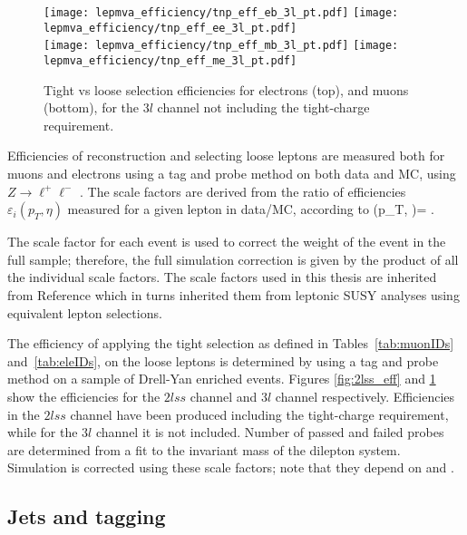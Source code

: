 \begin{figure}[!hb]
\centering
  \texttt{[image: lepmva\_efficiency/tnp\_eff\_eb\_3l\_pt.pdf]}
  \texttt{[image: lepmva\_efficiency/tnp\_eff\_ee\_3l\_pt.pdf]}\\
  \texttt{[image: lepmva\_efficiency/tnp\_eff\_mb\_3l\_pt.pdf]}
  \texttt{[image: lepmva\_efficiency/tnp\_eff\_me\_3l\_pt.pdf]}
\caption[Tight vs loose lepton selection efficiencies in the $3l$ channel.]{Tight vs loose selection efficiencies for electrons (top), and muons (bottom), for the $3l$ channel not including the tight-charge requirement.}
\label{fig:3l_eff}
\end{figure}

Efficiencies of reconstruction and selecting loose leptons are measured both for muons and electrons using a tag and probe method on both data and MC, using $Z\rightarrow\ell^{+}\ell^{-}$ \cite{tnp}. The scale factors are derived from the ratio of efficiencies $\varepsilon_{i}(p_T, \eta)$ measured for a given lepton in data/MC, according to 
\beqn
\rho(p_T, \eta)= .
\eeqn

The scale factor for each event is used to correct the weight of the event in the full sample; therefore, the full simulation correction is given by the product of all the individual scale factors. The scale factors used in this thesis are inherited from Reference \cite{CMS_AN_2017-029} which in turns inherited them from leptonic SUSY analyses using equivalent lepton selections.

The efficiency of applying the tight selection as defined in Tables~\ref{tab:muonIDs} and~\ref{tab:eleIDs}, on the loose leptons is determined by using a tag and probe method on a sample of Drell-Yan enriched events. Figures \ref{fig:2lss_eff} and \ref{fig:3l_eff} show the efficiencies for the $2lss$ channel and $3l$ channel respectively. Efficiencies in the $2lss$ channel have been produced including the tight-charge requirement, while for the $3l$ channel it is not included. Number of passed and failed probes are determined from a fit to the invariant mass of the dilepton system. Simulation is corrected using these scale factors; note that they depend on \etac and \pt.   

\subsection{Jets and \bjet tagging}

